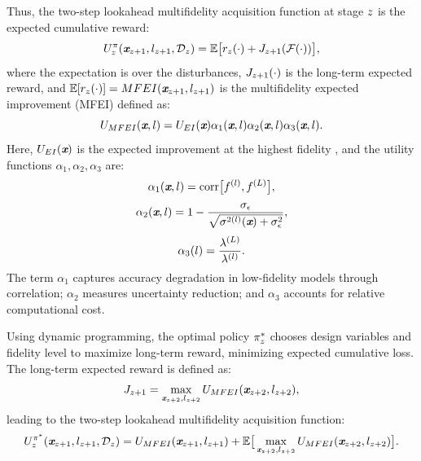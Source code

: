 Thus, the two-step lookahead multifidelity acquisition function at stage \(z\) is the expected cumulative reward:
\begin{equation}\label{e:2LookMFAF3}
	\begin{aligned}
		U^{\pi}_{z} (\textbf{\em x}_{z+1}, l_{z+1}, \mathcal{D}_{z}) = \mathbb{E} \big[ r_{z}(\cdot) + J_{z+1}(\mathcal{F}(\cdot)) \big],
	\end{aligned}
\end{equation}
where the expectation is over the disturbances, \(J_{z+1}(\cdot)\) is the long-term expected reward, and \(\mathbb{E}[r_{z}(\cdot)] = MFEI(\textbf{\em x}_{z+1}, l_{z+1})\) is the multifidelity expected improvement (MFEI) \cite{huang2006sequential} defined as:
\begin{equation} \label{e:MFAF1}
	U_{MFEI}(\textbf{\em x}, l) = U_{EI}(\textbf{\em x}) \alpha_1(\textbf{\em x}, l) \alpha_2(\textbf{\em x}, l) \alpha_3(\textbf{\em x}, l).
\end{equation}
Here, \(U_{EI}(\textbf{\em x})\) is the expected improvement at the highest fidelity \cite{jones1998efficient}, and the utility functions \(\alpha_1, \alpha_2, \alpha_3\) are:
\begin{equation}\label{e:MFAF3}
	\alpha_1 (\textbf{\em x}, l) = \mathrm{corr} \big[ f^{(l)}, f^{(L)} \big],
\end{equation}
\begin{equation} \label{e:MFAF4}
	\alpha_2 (\textbf{\em x}, l) = 1 - \frac{\sigma_{\epsilon}}{\sqrt{\sigma^{2(l)}(\textbf{\em x}) + \sigma_{\epsilon}^{2}}},
\end{equation}
\begin{equation} \label{e:MFAF5}
	\alpha_3 (l) = \frac{\lambda^{(L)}}{\lambda^{(l)}}.
\end{equation}
The term \(\alpha_1\) captures accuracy degradation in low-fidelity models through correlation; \(\alpha_2\) measures uncertainty reduction; and \(\alpha_3\) accounts for relative computational cost.

Using dynamic programming, the optimal policy \(\pi^*_{z}\) chooses design variables and fidelity level to maximize long-term reward, minimizing expected cumulative loss. The long-term expected reward is defined as:
\begin{equation}\label{e:2LookMFAF4}
	J_{z+1} = \max_{\textbf{\em x}_{z+2}, l_{z+2}} U_{MFEI}(\textbf{\em x}_{z+2}, l_{z+2}),
\end{equation}
leading to the two-step lookahead multifidelity acquisition function:
\begin{equation}\label{e:2LookMFAF5}
	U^{\pi^*}_{z}(\textbf{\em x}_{z+1}, l_{z+1}, \mathcal{D}_{z}) = U_{MFEI}(\textbf{\em x}_{z+1}, l_{z+1}) + \mathbb{E} \big[ \max_{\textbf{\em x}_{z+2}, l_{z+2}} U_{MFEI}(\textbf{\em x}_{z+2}, l_{z+2}) \big].
\end{equation}

